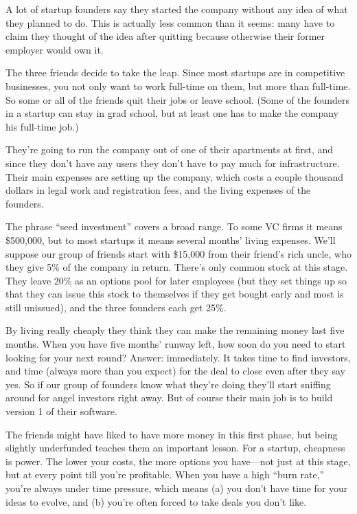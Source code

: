 A lot of startup founders say they started the company without any idea
of what they planned to do. This is actually less common than it seems:
many have to claim they thought of the idea after quitting because
otherwise their former employer would own it.

The three friends decide to take the leap. Since most startups are in
competitive businesses, you not only want to work full-time on them, but
more than full-time. So some or all of the friends quit their jobs or
leave school. (Some of the founders in a startup can stay in grad
school, but at least one has to make the company his full-time job.)

They're going to run the company out of one of their apartments at
first, and since they don't have any users they don't have to pay much
for infrastructure. Their main expenses are setting up the company,
which costs a couple thousand dollars in legal work and registration
fees, and the living expenses of the founders.

The phrase ``seed investment'' covers a broad range. To some VC firms it
means \$500,000, but to most startups it means several months' living
expenses. We'll suppose our group of friends start with \$15,000 from
their friend's rich uncle, who they give 5\% of the company in return.
There's only common stock at this stage. They leave 20\% as an options
pool for later employees (but they set things up so that they can issue
this stock to themselves if they get bought early and most is still
unissued), and the three founders each get 25\%.

By living really cheaply they think they can make the remaining money
last five months. When you have five months' runway left, how soon do
you need to start looking for your next round? Answer: immediately. It
takes time to find investors, and time (always more than you expect) for
the deal to close even after they say yes. So if our group of founders
know what they're doing they'll start sniffing around for angel
investors right away. But of course their main job is to build version 1
of their software.

The friends might have liked to have more money in this first phase, but
being slightly underfunded teaches them an important lesson. For a
startup, cheapness is power. The lower your costs, the more options you
have---not just at this stage, but at every point till you're
profitable. When you have a high ``burn rate,'' you're always under time
pressure, which means (a) you don't have time for your ideas to evolve,
and (b) you're often forced to take deals you don't like.

